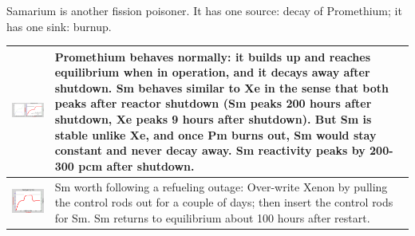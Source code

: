 \documentclass{school-22.211-notes}
\begin{document}
\clearpage
{}
Samarium is another fission poisoner. It has one source: decay of Promethium; it has one sink: burnup. 

\begin{table}
  \centering
  \begin{tabular}{|p{}|p{}|}\hline
    \begin{minipage}[b]{0.6\textwidth}
      \includegraphics[width=3.5in]{images/dfs/Pm-Sm-1.png} 
    \end{minipage}
    & 
    \begin{minipage}[b]{0.4\textwidth}
      Promethium behaves normally: it builds up and reaches equilibrium when in operation, and it decays away after shutdown. 
Sm behaves similar to Xe in the sense that both peaks after reactor shutdown (Sm peaks 200 hours after shutdown, Xe peaks 9 hours after shutdown). But Sm is stable unlike Xe, and once Pm burns out, Sm would stay constant and never decay away. Sm reactivity peaks by 200-300 pcm after shutdown. 
    \end{minipage}   \\ \hline
%
    \begin{minipage}[b]{0.6\textwidth}
      \includegraphics[width=3.5in]{images/dfs/Pm-Sm-2.png} 
    \end{minipage}
    & 
    \begin{minipage}[b]{0.4\textwidth}    
     Sm worth following a refueling outage: Over-write Xenon by pulling the control rods out for a couple of days; then insert the control rods for Sm. Sm returns to equilibrium about 100 hours after restart.

\end{minipage}
\end{tabular}
\end{table}
\end{document}
